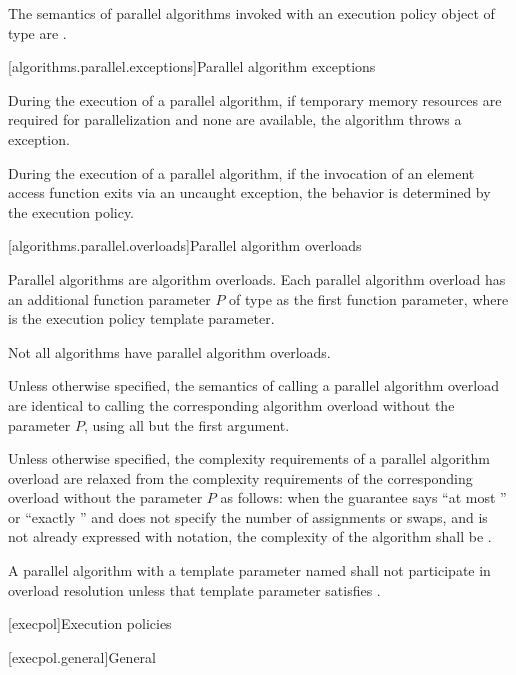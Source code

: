 \pnum
The semantics of parallel algorithms invoked with an execution policy object of
 type
are .

[algorithms.parallel.exceptions]{Parallel algorithm exceptions}

\pnum
During the execution of a parallel algorithm,
if temporary memory resources are required for parallelization
and none are available, the algorithm throws a  exception.

\pnum
During the execution of a parallel algorithm,
if the invocation of an element access function exits via an uncaught exception,
the behavior is determined by the execution policy.

[algorithms.parallel.overloads]{Parallel algorithm overloads}

\pnum
Parallel algorithms are algorithm overloads.
Each parallel algorithm overload
has an additional function parameter $P$ of type 
as the first function parameter,
where  is the execution policy template parameter.
\begin{note}
Not all algorithms have parallel algorithm overloads.
\end{note}

\pnum
Unless otherwise specified,
the semantics of calling a parallel algorithm overload are identical to
calling the corresponding algorithm overload without the parameter $P$,
using all but the first argument.

\pnum
Unless otherwise specified,
the complexity requirements of a parallel algorithm overload
are relaxed from the complexity requirements of the corresponding overload
without the parameter $P$
as follows:
when the guarantee says ``at most '' or
``exactly ''
and does not specify the number of assignments or swaps, and
 is not already expressed with \bigoh{} notation,
the complexity of the algorithm shall be .

\pnum
A parallel algorithm
with a template parameter named 
shall not participate in overload resolution unless
that template parameter satisfies .

[execpol]{Execution policies}

[execpol.general]{General}

